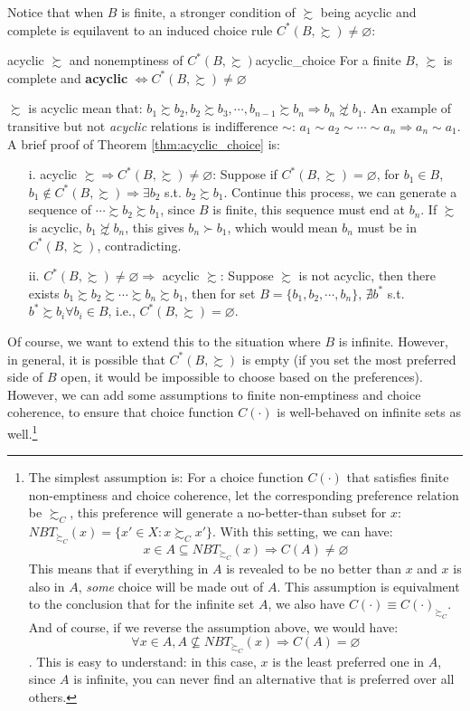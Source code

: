 Notice that when $B$ is finite, a stronger condition of $\succsim$ being acyclic and complete is equilavent to an induced choice rule $C^*(B,\succsim)\neq \varnothing$: 
\begin{theorem}{acyclic $\succsim$ and nonemptiness of $C^*(B,\succsim)$}{acyclic_choice}
    For a finite $B$, $\succsim$ is complete and \textbf{acyclic} $\Leftrightarrow C^*(B,\succsim)\neq \varnothing$
\end{theorem}
$\succsim$ is acyclic mean that: $b_1\succsim b_2,b_2\succsim b_3,\cdots, b_{n-1}\succsim b_n\Rightarrow b_n\not\succsim b_1$. An example of transitive but not \textit{acyclic} relations is indifference $\sim$: $a_1\sim a_2\sim \cdots\sim a_n\Rightarrow a_n\sim a_1$.
A brief proof of Theorem \ref{thm:acyclic_choice} is:
\begin{enumerate}
    \item[i.] acyclic $\succsim\Rightarrow C^*(B,\succsim)\neq\varnothing$: Suppose if $C^*(B,\succsim)=\varnothing$, for $b_1\in B$, $b_1\notin C^*(B,\succsim)\Rightarrow \exists b_2$ s.t. $b_2\succsim b_1$. Continue this process, we can generate a sequence of $\cdots\succsim b_2\succsim b_1$, since $B$ is finite, this sequence must end at $b_n$. If $\succsim$ is acyclic, $b_1\not\succsim b_n$, this gives $b_n\succ b_1$, which would mean $b_n$ must be in $C^*(B,\succsim)$, contradicting.
    \item[ii.] $C^*(B,\succsim)\neq\varnothing\Rightarrow$ acyclic $\succsim$: Suppose $\succsim$ is not acyclic, then there exists $b_1\succsim b_2\succsim \cdots\succsim b_n\succsim b_1$, then for set $B=\{b_1,b_2,\cdots,b_n\}$, $\nexists b^*$ s.t. $b^*\succsim b_i \forall b_i\in B$, i.e., $C^*(B,\succsim)=\varnothing$.
\end{enumerate}

Of course, we want to extend this to the situation where $B$ is infinite. However, in general, it is possible that $C^*(B,\succsim)$ is empty (if you set the most preferred side of $B$ open, it would be impossible to choose based on the preferences). However, we can add some assumptions to finite non-emptiness and choice coherence, to ensure that choice function $C(\cdot)$ is well-behaved on infinite sets as well.\footnote{
    The simplest assumption is:
    For a choice function $C(\cdot)$ that satisfies finite non-emptiness and choice coherence, let the corresponding preference relation be $\succsim_C$, this preference will generate a no-better-than subset for $x$: $NBT_{\succsim_C}(x)=\{x'\in X:x \succsim_C x'\}$. With this setting, we can have:
    $$x \in A \subseteq NBT_{\succsim_C}(x)\Rightarrow C(A)\neq \varnothing$$
    This means that if everything in $A$ is revealed to be no better than $x$ and $x$ is also in $A$, \textit{some} choice will be made out of $A$. This assumption is equivalment to the conclusion that for the infinite set $A$, we also have $C(\cdot)\equiv C(\cdot)_{\succsim_C}$. And of course, if we reverse the 
    assumption above, we would have:
    $$\forall x\in A, A\not\subseteq NBT_{\succsim_C}(x)\Rightarrow C(A)=\varnothing$$.
    This is easy to understand: in this case, $x$ is the least preferred one in $A$, since $A$ is infinite, you can never find an alternative that is preferred over all others.  
}


